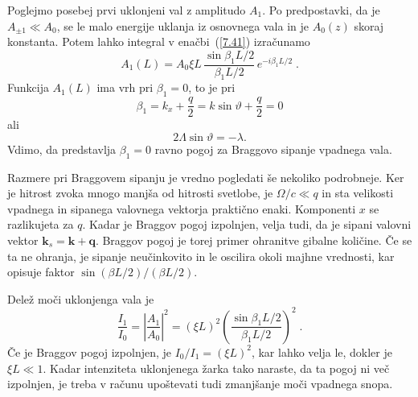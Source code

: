 Poglejmo posebej prvi uklonjeni val z amplitudo $A_{1}$. Po predpostavki,
da je $A_{\pm1}\ll A_{0}$, se le malo energije uklanja iz osnovnega
vala in je $A_{0}(z)$ skoraj konstanta. Potem lahko integral v enačbi~(\ref{7.41})
izračunamo
\begin{equation}
A_{1}(L)=A_{0}\xi L\,\frac{\sin\beta_{1}L/2}{\beta_{1}L/2}\, e^{-i\beta_{1}L/2}\;.
\label{7.41a}
\end{equation}
Funkcija $A_{1}(L)$ ima vrh pri $\beta_{1}=0$, to je pri 
\begin{equation}
\beta_1 = k_x+ \frac{q}{2} = k \sin\vartheta + \frac{q}{2} = 0
\label{7.42}
\end{equation}
ali 
\begin{equation}
2\Lambda\sin\vartheta=-\lambda.
\label{7.43}
\end{equation}
Vdimo, da predstavlja $\beta_{1}=0$ ravno pogoj za Braggovo sipanje vpadnega
vala.

Razmere pri Braggovem sipanju je vredno pogledati še nekoliko podrobneje.
Ker je hitrost zvoka mnogo manjša od hitrosti svetlobe, je $\Omega/c\ll q$
in sta velikosti vpadnega in sipanega valovnega vektorja praktično enaki. 
Komponenti $x$ se razlikujeta za $q$. Kadar je Braggov pogoj izpolnjen, velja
tudi, da je sipani valovni vektor $\mathbf{k}_{s}=\mathbf{k}+\mathbf{q}$.
Braggov pogoj je torej primer ohranitve gibalne količine. Če se ta ne ohranja, 
je sipanje neučinkovito in le oscilira okoli majhne vrednosti, kar opisuje 
faktor $\sin(\beta L/2)/(\beta L/2)$.

Delež moči uklonjenga vala je 
\begin{equation}
\frac{I_{1}}{I_{0}}=\left|\frac{A_{1}}{A_{0}}\right|^{2}=(\xi L)^{2}
\left(\frac{\sin\beta_{1}L/2}{\beta_{1}L/2}\right)^{2}\;.\label{7.45}
\end{equation}
Če je Braggov pogoj izpolnjen, je $I_{0}/I_{1}=(\xi L)^{2}$,
kar lahko velja le, dokler je $\xi L\ll1$. Kadar intenziteta uklonjenega žarka
tako naraste, da ta pogoj ni več izpolnjen, je treba v računu upoštevati tudi 
zmanjšanje moči vpadnega snopa.

